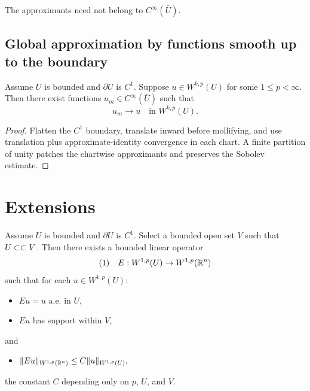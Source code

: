 \begin{remark}
\label{rem:approximation-not-up-to-boundary}

The approximants need not belong to $C^\infty(\bar U)$.
\end{remark}

\subsection{Global approximation by functions smooth up to the boundary}

\begin{theorem}
\label{thm:global-smooth-approximation-boundary}

Assume $U$ is bounded and $\partial U$ is $C^1$. Suppose $u \in W^{k,p}(U)$ for some $1 \le p < \infty$. Then there exist functions $u_m \in C^\infty(\bar U)$ such that
$$u_m \to u \quad \text{in } W^{k,p}(U).$$
\end{theorem}

\begin{proof}
\sketch Flatten the $C^1$ boundary, translate inward before mollifying, and use translation plus approximate-identity convergence in each chart. A finite partition of unity patches the chartwise approximants and preserves the Sobolev estimate.
\end{proof}

\section{Extensions}
\label{sec:sobolev-extensions}

\begin{theorem}
\label{thm:sobolev-extension-theorem}

Assume $U$ is bounded and $\partial U$ is $C^1$. Select a bounded open set $V$ such that $U \subset\subset V$. Then there exists a bounded linear operator
$$(1) \quad E: W^{1,p}(U) \to W^{1,p}(\mathbb{R}^n)$$
such that for each $u \in W^{1,p}(U)$:
\begin{itemize}
\item[(i)] $Eu = u$ a.e. in $U$,
\item[(ii)] $Eu$ has support within $V$,
\end{itemize}
and
\begin{itemize}
\item[(iii)] $\|Eu\|_{W^{1,p}(\mathbb{R}^n)} \le C\|u\|_{W^{1,p}(U)},$
\end{itemize}
the constant $C$ depending only on $p$, $U$, and $V$.
\end{theorem}

